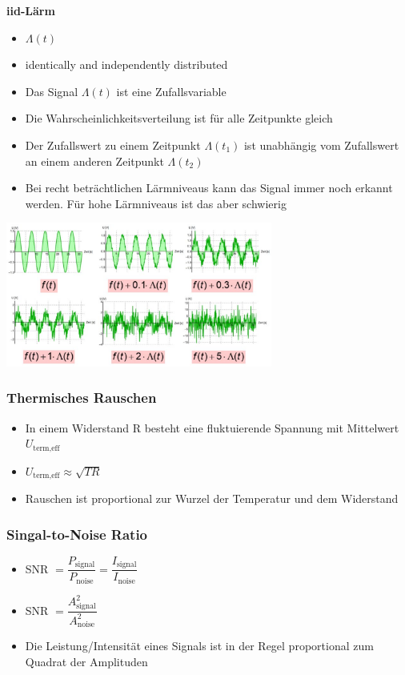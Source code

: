 \documentclass[8pt,a4paper]{scrartcl}
\begin{document}
\begin{multicols*}{3}
								\textbf{iid-Lärm}
								\begin{itemize}\itemsep0pt
									\item $\Lambda(t)$
									\item identically and independently distributed
									\item Das Signal $\Lambda(t)$ ist eine Zufallsvariable
									\item Die Wahrscheinlichkeitsverteilung ist für alle Zeitpunkte gleich
									\item Der Zufallswert zu einem Zeitpunkt $\Lambda(t_{1})$ ist unabhängig vom Zufallswert an einem anderen Zeitpunkt $\Lambda(t_{2})$
									\item Bei recht beträchtlichen Lärmniveaus kann das Signal immer noch erkannt werden. Für hohe Lärmniveaus ist das aber schwierig
								\end{itemize}	
								\includegraphics[height=4.75cm]{img/laerm.png} 
								
							\subsubsection{Thermisches Rauschen}
								\begin{itemize}\itemsep0pt
									\item In einem Widerstand R besteht eine fluktuierende Spannung mit Mittelwert $U_{\text{term,eff}}$
									\item $U_{\text{term,eff}} \approx \sqrt{TR}$
									\item Rauschen ist proportional zur Wurzel der Temperatur und dem Widerstand
								\end{itemize}	
								
							\subsubsection{Singal-to-Noise Ratio}
							\begin{itemize}\itemsep0pt
									\item SNR $=\dfrac{P_{\text{signal}}}{P_{\text{noise}}}=\dfrac{I_{\text{signal}}}{I_{\text{noise}}}$
									\item SNR $=\dfrac{A_{\text{signal}}^{2}}{A_{\text{noise}}^{2}}$
									\item Die Leistung/Intensität eines Signals ist in der Regel proportional zum Quadrat der Amplituden
								\end{itemize}	
								


\end{multicols*}

\end{document}
